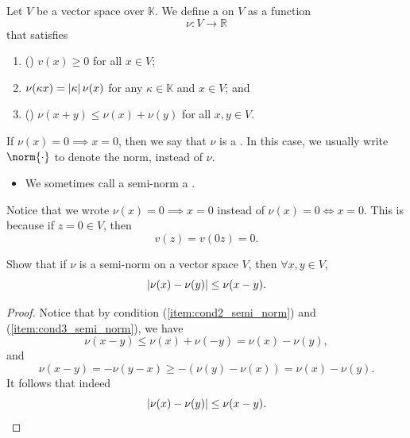 \documentclass[notoc,notitlepage]{tufte-book}
\begin{document}
\begin{defn}\label{defn:semi_norm}
  Let $V$ be a vector space over $\mathbb{K}$. We define a
   on $V$ as a function
  \begin{equation*}
    \nu : V \to \mathbb{R}
  \end{equation*}
  that satisfies
  \begin{enumerate}
    \item () $v(x) \geq 0$ for all $x \in V$;
      \label{item:cond1_semi_norm}
    \item $\nu(\kappa x) = \left|\kappa\right| \nu(x)$ for any $\kappa \in \mathbb{K}$ 
      and $x \in V$; and \label{item:cond2_semi_norm}
    \item () $\nu(x + y) \leq \nu(x) + \nu(y)$ for
      all $x, y \in V$. \label{item:cond3_semi_norm}
  \end{enumerate}
  If $\nu(x) = 0 \implies x = 0$, then we say that $\nu$ is a . In
  this case, we usually write $\norm{\cdot}$ to denote the norm, instead of
  $\nu$.
\end{defn}

\begin{note}
  \begin{itemize}
    \item We sometimes call a semi-norm a .
  \end{itemize}
\end{note}

\begin{remark}
  Notice that we wrote $\nu(x) = 0 \implies x = 0$ instead of $\nu(x) = 0 \iff x
  = 0$. This is because if $z = 0 \in V$, then
  \begin{equation*}
    v(z) = v(0 z) = 0.
  \end{equation*}
\end{remark}

\begin{ex}
  Show that if $\nu$ is a semi-norm on a vector space $V$, then $\forall x, y
  \in V$,
  \begin{equation*}
    \left|\nu(x) - \nu(y)\right| \leq \nu(x - y).
  \end{equation*}
\end{ex}

\begin{proof}
  Notice that by condition (\ref{item:cond2_semi_norm}) and
  (\ref{item:cond3_semi_norm}), we have
  \begin{equation*}
    \nu(x - y) \leq \nu(x) + \nu(-y) = \nu(x) - \nu(y),
  \end{equation*}
  and
  \begin{equation*}
    \nu(x - y) = -\nu(y - x) \geq - (\nu(y) - \nu(x)) = \nu(x) - \nu(y).
  \end{equation*}
  It follows that indeed
  \begin{equation*}
    \left|\nu(x) - \nu(y)\right| \leq \nu(x - y).
  \end{equation*}
\end{proof}
\end{document}
